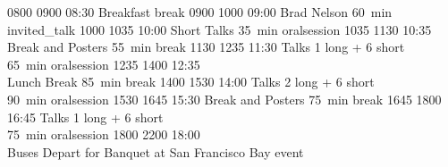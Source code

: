 \begin{timetable}
   {0800} {0900} {08:30 Breakfast}                      {}                            {}        {break}
   {0900} {1000} {09:00 Brad Nelson}                 {60~min}                        {}                      {invited_talk}
   {1000} {1035} {10:00 Short Talks}                  {\vspace{1.5mm}35~min}          {}        {oralsession}
   {1035} {1130} {10:35 Break and Posters}            {\vspace{1.5mm}55~min}          {}      {break}
   {1130} {1235} {11:30 Talks}                        {\vspace{-0.5em}1 long + 6 short\\65~min}{}             {oralsession}
   {1235} {1400} {12:35\\[0.2em]Lunch Break}          {85~min}                        {}                            {break}
   {1400} {1530} {14:00 Talks}                        {\vspace{-0.5em}2 long + 6 short\\90~min}{}             {oralsession}
   {1530} {1645} {15:30 Break and Posters}            {\vspace{1.5mm}75~min}          {}      {break}
   {1645} {1800} {16:45 Talks}                        {\vspace{-0.5em}1 long + 6 short\\75~min}{}             {oralsession}
   {1800} {2200} {18:00\\\vspace{0.3em}Buses Depart for Banquet}       {}          {\vspace{-0.7em}at San Francisco Bay}     {event}




\end{timetable}
